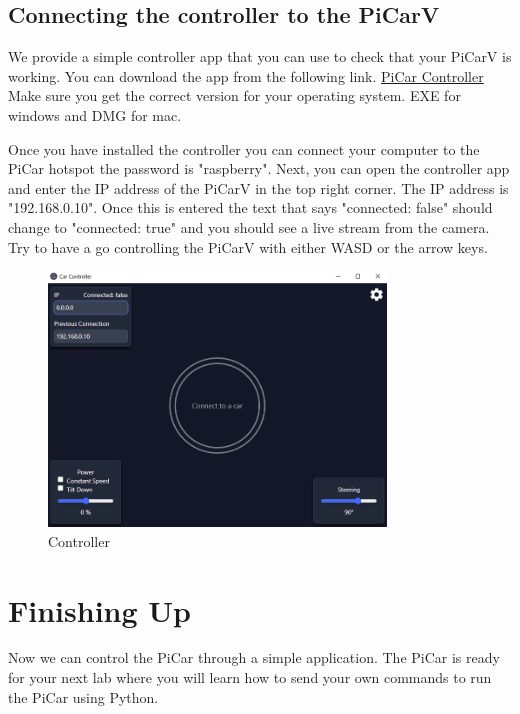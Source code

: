 \documentclass[12pt]{report} %
\begin{document}
\section{Connecting the controller to the PiCarV}
We provide a simple controller app that you can use to check that your PiCarV is working. You can download the app from the following link. 
\href{https://github.com/PiCarV/Controller/releases}{PiCar Controller} Make sure you get the correct version for your operating system. EXE for windows and DMG for mac.


Once you have installed the controller you can connect your computer to the PiCar hotspot the password is "raspberry". Next, you can open the controller app and enter the IP address of the PiCarV in the top right corner. The IP address is "192.168.0.10". Once this is entered the text that says "connected: false" should change to "connected: true" and you should see a live stream from the camera. Try to have a go controlling the PiCarV with either WASD or the arrow keys. 

\begin{figure}[h]
    \centering
    \includegraphics[width=0.8\textwidth]{controller.png}
    \caption{Controller}
    \label{fig:Controller}
\end{figure}

\chapter{Finishing Up}
Now we can control the PiCar through a simple application. The PiCar is ready for your next lab where you will learn how to send your own commands to run the PiCar using Python.
\end{document}
